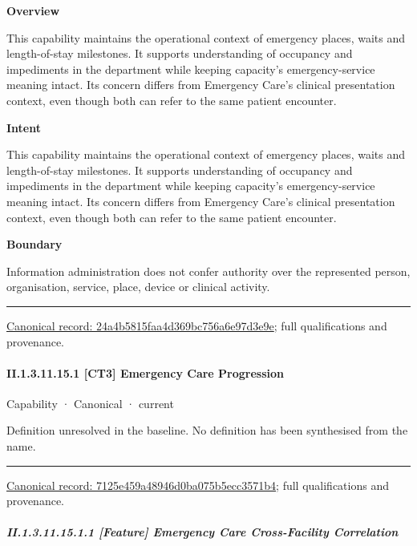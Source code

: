 \textbf{Overview}



This capability maintains the operational context of emergency places, waits and length-of-stay milestones. It supports understanding of occupancy and impediments in the department while keeping capacity's emergency-service meaning intact. Its concern differs from Emergency Care's clinical presentation context, even though both can refer to the same patient encounter.



\textbf{Intent}



This capability maintains the operational context of emergency places, waits and length-of-stay milestones. It supports understanding of occupancy and impediments in the department while keeping capacity's emergency-service meaning intact. Its concern differs from Emergency Care's clinical presentation context, even though both can refer to the same patient encounter.



\textbf{Boundary}



Information administration does not confer authority over the represented person, organisation, service, place, device or clinical activity.



\medskip\hrule\medskip

{\footnotesize \href{../../../../continuum/strategy/capability/24a4b5815faa4d369bc756a6e97d3e9e.md}{Canonical record: 24a4b5815faa4d369bc756a6e97d3e9e}; full qualifications and provenance.}\par
\paragraph*{II.1.3.11.15.1 [CT3] Emergency Care Progression}
\label{navigation:II.1.3.11.15.1}

\label{element:7125e459a48946d0ba075b5ecc3571b4}
{\small Capability · Canonical · current}\par

Definition unresolved in the baseline. No definition has been synthesised from the name.



\medskip\hrule\medskip

{\footnotesize \href{../../../../continuum/strategy/capability/7125e459a48946d0ba075b5ecc3571b4.md}{Canonical record: 7125e459a48946d0ba075b5ecc3571b4}; full qualifications and provenance.}\par
\subparagraph*{II.1.3.11.15.1.1 [Feature] Emergency Care Cross-Facility Correlation}
\label{navigation:II.1.3.11.15.1.1}

